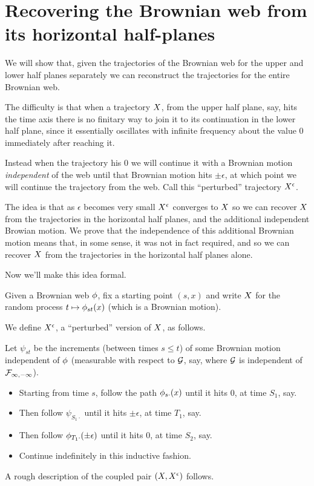 {
\section {Recovering the Brownian web from its horizontal half-planes}

We will show that, given the trajectories of the Brownian web for the
upper and lower half planes separately we can reconstruct the
trajectories for the entire Brownian web.

The difficulty is that when a trajectory $X$, from the upper
half plane, say, hits the time axis there is no finitary way to join
it to its continuation in the lower half plane, since it essentially
oscillates with infinite frequency about the value $0$ immediately
after reaching it.

Instead when the trajectory his $0$ we will continue it with a
Brownian motion \emph{independent} of the web until that Brownian
motion hits $\pm\epsilon$, at which point we will continue the
trajectory from the web.  Call this ``perturbed'' trajectory
$X^{\epsilon}$.

The idea is that as $\epsilon$ becomes very small $X^{\epsilon}$
converges to $X$ so we can recover $X$ from the
trajectories in the horizontal half planes, and the additional
independent Browian motion.  We prove that the independence of this
additional Brownian motion means that, in some sense, it was not in
fact required, and so we can recover $X$ from the
trajectories in the horizontal half planes alone.

Now we'll make this idea formal.

\begin{notation}
Given a Brownian web $\phi$, fix a starting point $(s,x)$ and write
$X$ for the random process $t \mapsto \phi_{{s}{t}}(x)$
(which is a Brownian motion).
\end{notation}

{
\newcommand{\joinernoargs}{\psi}
\newcommand{\joiner}[2]{\joinernoargs_{{#1}{#2}}}
\begin{definition}
  We define $X^{\epsilon}$, a ``perturbed'' version of $X$, as
  follows.

  Let $\joiner{s}{t}$ be the increments (between times $s \le t$) of
  some Brownian motion independent of $\phi$ (measurable with
  respect to $\mathcal{G}$, say, where $\mathcal{G}$ is independent of
  $\mathcal{F}_{\infty,-\infty}$).

  \begin{itemize}
  \item Starting from time $s$, follow the path $\phi_{{s}{\cdot}}(x)$
    until it hits $0$, at time $S_1$, say.
  \item Then follow $\joiner{S_1}{\cdot}$ until it hits $\pm \epsilon$, at
    time $T_1$, say.
  \item Then follow $\phi_{{T_1}{\cdot}}(\pm \epsilon)$ until it hits $0$, at
    time $S_2$, say.
  \item Continue indefinitely in this inductive fashion.
  \end{itemize}
\end{definition}
}

\begin{obs}
  \label{obs:2d-proc}
  A rough description of the coupled pair $(X, X^{\epsilon})$
  follows.

\end{obs}
}
